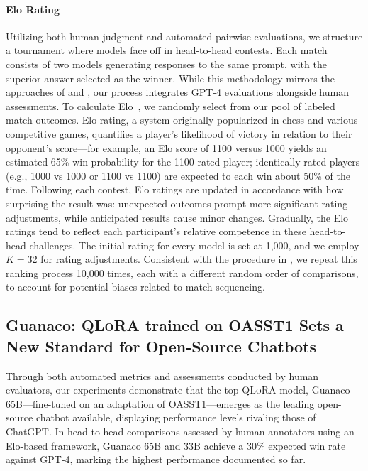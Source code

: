 \paragraph{Elo Rating} Utilizing both human judgment and automated pairwise evaluations, we structure a tournament where models face off in head-to-head contests. Each match consists of two models generating responses to the same prompt, with the superior answer selected as the winner. While this methodology mirrors the approaches of \citet{bai2022training} and \citet{vicuna2023}, our process integrates GPT-4 evaluations alongside human assessments. To calculate Elo~\citep{elo1967proposed,elo1978rating}, we randomly select from our pool of labeled match outcomes. Elo rating, a system originally popularized in chess and various competitive games, quantifies a player's likelihood of victory in relation to their opponent’s score—for example, an Elo score of 1100 versus 1000 yields an estimated 65\% win probability for the 1100-rated player; identically rated players (e.g., 1000 vs 1000 or 1100 vs 1100) are expected to each win about 50\% of the time. Following each contest, Elo ratings are updated in accordance with how surprising the result was: unexpected outcomes prompt more significant rating adjustments, while anticipated results cause minor changes. Gradually, the Elo ratings tend to reflect each participant's relative competence in these head-to-head challenges. The initial rating for every model is set at 1,000, and we employ $K=32$ for rating adjustments. Consistent with the procedure in \citet{vicuna2023}, we repeat this ranking process 10,000 times, each with a different random order of comparisons, to account for potential biases related to match sequencing.

\subsection{\textbf{Guanaco}: \textsc{QLoRA} trained on OASST1 Sets a New Standard for Open-Source Chatbots}

Through both automated metrics and assessments conducted by human evaluators, our experiments demonstrate that the top \textsc{QLoRA} model, {Guanaco} 65B—fine-tuned on an adaptation of OASST1—emerges as the leading open-source chatbot available, displaying performance levels rivaling those of ChatGPT. In head-to-head comparisons assessed by human annotators using an Elo-based framework, {Guanaco} 65B and 33B achieve a 30\% expected win rate against GPT-4, marking the highest performance documented so far.

